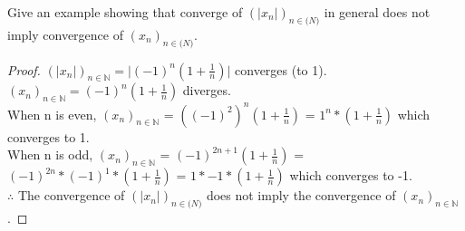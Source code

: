 \documentclass[12pt]{article}
\providecommand{\abs}[1]{\lvert #1 \rvert}
\theoremstyle{definition}
\numberwithin{equation}{subsection}
\begin{document}
Give an example showing that converge of $(\abs{x_n})_{n\in \mathbb(N)}$ in general does not imply convergence of $(x_n)_{n\in \mathbb(N)}$.

\begin{proof}
$(\abs{x_n})_{n\in \mathbb{N}} = \abs{(-1)^n(1 + \frac{1}{n})}$ converges (to 1).
\\ $(x_n)_{n \in \mathbb{N}} = (-1)^n(1 + \frac{1}{n})$ diverges.
\\ When n is even, $(x_n)_{n \in \mathbb{N}}$ = $((-1)^2)^n(1 + \frac{1}{n})$ = $1^n*(1 + \frac{1}{n})$ which converges to 1.
\\ When n is odd, $(x_n)_{n \in \mathbb{N}}$ = $(-1)^{2n+1}(1 + \frac{1}{n})$ = $(-1)^{2n}*(-1)^{1}*(1 + \frac{1}{n})$ = $1*-1*(1 + \frac{1}{n})$ which converges to -1.
\\ $\therefore$ The convergence of $(\abs{x_n})_{n\in \mathbb(N)}$ does not imply the convergence of $(x_n)_{n \in \mathbb{N}}$.
\end{proof}
\end{document}
